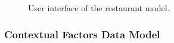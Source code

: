 \begin{figure}
\captionsetup{justification=centering,margin=2cm,font=footnotesize}
\centering
\setlength\fboxsep{0pt}
\setlength\fboxrule{0.7pt}
\caption{User interface of the restaurant model.}
\label{fig:restaurantmodel}       
\end{figure}

\subsubsection{Contextual Factors Data Model} \label{datamodelsection}   

